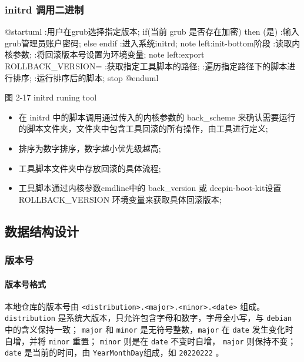 \documentclass{utart}
\begin{document}
\subsubsection{initrd 调用二进制}
\begin{center}
  \begin{adjustbox}{scale=0.65}
    \begin{plantuml}
      @startuml
      :用户在grub选择指定版本;
      if(当前 grub 是否存在加密) then (是)
      :输入grub管理员账户密码;
      else
      endif
      :进入系统initrd;
      note left:init-bottom阶段
      :读取内核参数;
      :将回滚版本号设置为环境变量;
      note left:export ROLLBACK_VERSION=
      :获取指定工具脚本的路径;
      :遍历指定路径下的脚本进行排序;
      :运行排序后的脚本;
      stop
      @enduml
    \end{plantuml}
  \end{adjustbox}

  图 2-17 initrd runing tool
\end{center}


\begin{itemize}[leftmargin=4em]
  \item 在 initrd 中的脚本调用通过传入的内核参数的 back\_scheme 来确认需要运行的脚本文件夹，文件夹中包含工具回滚的所有操作，由工具进行定义;
  \item 排序为数字排序，数字越小优先级越高;
  \item 工具脚本文件夹中存放回滚的具体流程;
  \item 工具脚本通过内核参数cmdline中的 back\_version 或 deepin-boot-kit设置 ROLLBACK\_VERSION 环境变量来获取具体回滚版本;
\end{itemize}

\subsection{数据结构设计}
\subsubsection{版本号}
\paragraph{版本号格式}
本地仓库的版本号由 \texttt{<distribution>.<major>.<minor>.<date>} 组成。
\texttt{distribution} 是系统大版本，只允许包含字母和数字，字母全小写，与 \texttt{debian} 中的含义保持一致；
\texttt{major} 和 \texttt{minor} 是无符号整数，\texttt{major} 在 \texttt{date} 发生变化时自增，并将 \texttt{minor} 重置；
\texttt{minor} 则是在 \texttt{date} 不变时自增， \texttt{major} 则保持不变；
\texttt{date} 是当前的时间，由 \texttt{YearMonthDay}组成，如 \texttt{20220222} 。
\end{document}

